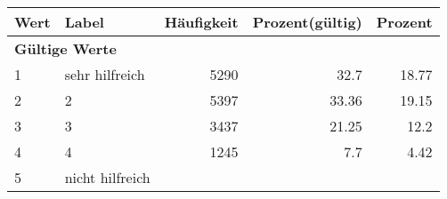     \begin{longtable}{lXrrr}
     \toprule
     \textbf{Wert} & \textbf{Label} & \textbf{Häufigkeit} & \textbf{Prozent(gültig)} & \textbf{Prozent} \\
     \endhead
     \midrule
     \multicolumn{5}{l}{\textbf{Gültige Werte}}\\

     1 &
     \multicolumn{1}{X}{ sehr hilfreich   } &


       \num{5290} &
       \num[round-mode=places,round-precision=2]{32,7} &
         \num[round-mode=places,round-precision=2]{18,77} \\

     2 &
     \multicolumn{1}{X}{ 2   } &


       \num{5397} &
       \num[round-mode=places,round-precision=2]{33,36} &
         \num[round-mode=places,round-precision=2]{19,15} \\

     3 &
     \multicolumn{1}{X}{ 3   } &


       \num{3437} &
       \num[round-mode=places,round-precision=2]{21,25} &
         \num[round-mode=places,round-precision=2]{12,2} \\

     4 &
     \multicolumn{1}{X}{ 4   } &


       \num{1245} &
       \num[round-mode=places,round-precision=2]{7,7} &
         \num[round-mode=places,round-precision=2]{4,42} \\

     5 &
     \multicolumn{1}{X}{ nicht hilfreich   } &



\end{longtable}
